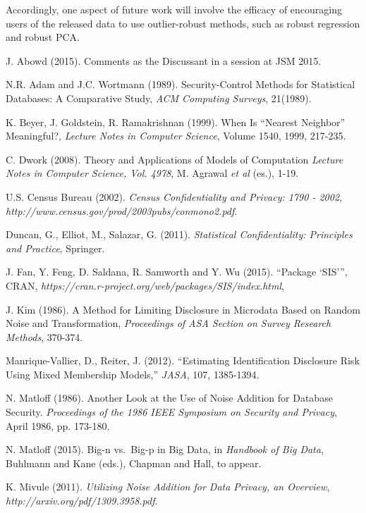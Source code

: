 \documentclass[11pt]{article}
\begin{document}
Accordingly, one aspect of future work will involve the efficacy of
encouraging users of the released data to use outlier-robust methods,
such as robust regression and robust PCA.

\begin{thebibliography}{}

 J. Abowd (2015). Comments as the Discussant in a session
at JSM 2015.

N.R. Adam and J.C. Wortmann (1989).
Security-Control Methods for Statistical Databases: A Comparative Study,
{\it ACM Computing Surveys}, 21(1989).

 K. Beyer, J. Goldstein, R. Ramakrishnan (1999).  When Is
``Nearest Neighbor'' Meaningful?, {\it Lecture Notes in Computer
Science}, Volume 1540, 1999, 217-235.

 C. Dwork (2008).  Theory and Applications of Models of
Computation {\it Lecture Notes in Computer Science, Vol. 4978}, M.
Agrawal {\it et al} (es.), 1-19.

 U.S. Census Bureau (2002). 
{\it Census Confidentiality and Privacy: 1790 - 2002},
{\it http://www.census.gov/prod/2003pubs/conmono2.pdf}.

 Duncan, G., Elliot, M., Salazar, G. (2011).  {\it
Statistical Confidentiality: Principles and Practice}, Springer. 

 J. Fan, Y. Feng, D. Saldana, R. Samworth and Y. Wu (2015).
``Package `SIS''', CRAN, {\it
https://cran.r-project.org/web/packages/SIS/index.html},

 J. Kim (1986).  A Method for Limiting Disclosure in
Microdata Based on Random Noise and Transformation, {\it Proceedings of
ASA Section on Survey Research Methods}, 370-374.

 Manrique-Vallier, D., Reiter, J. (2012).
``Estimating Identification Disclosure Risk Using Mixed Membership
Models,'' {\it JASA}, 107, 1385-1394.

 N. Matloff (1986). Another Look at the Use of
Noise Addition for Database Security. {\it Proceedings of the 1986 IEEE
Symposium on Security and Privacy}, April 1986, pp. 173-180.

  N. Matloff (2015).  Big-n vs.\ Big-p in Big Data,
in {\it Handbook of Big Data}, Buhlmann and Kane (eds.), Chapman and
Hall, to appear.

K. Mivule (2011).  {\it Utilizing Noise Addition for Data Privacy, an 
Overview}, {\it http://arxiv.org/pdf/1309.3958.pdf}.


\end{thebibliography}
\end{document}
